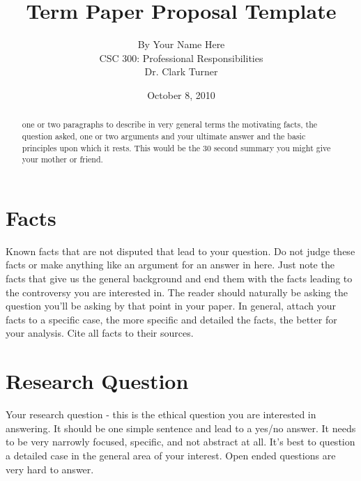 \documentclass[12pt]{article}
\begin{document}
\title{\vfill Term Paper Proposal Template} %
\author{
 By Your Name Here \vspace{10pt} \\ 
CSC 300: Professional Responsibilities  \vspace{10pt} \\ 
Dr. Clark Turner \vspace{10pt} \\ 
}
\date{October 8, 2010} %

\maketitle

\vfill  %
\begin{abstract}
one or two paragraphs to describe in very general terms the motivating facts, the question asked, one or two arguments and your ultimate answer and the basic principles upon which it rests. This would be the 30 second summary you might give your mother or friend. \cite{handout}
\end{abstract}

\thispagestyle{empty} %
\newpage



\section{Facts}
Known facts that are not disputed that lead to your question. Do not judge these facts or make anything like an argument for an answer in here. Just note the facts that give us the general background and end them with the facts leading to the controversy you are interested in. The reader should naturally be asking the question you'll be asking by that point in your paper. In general, attach your facts to a specific case, the more specific and detailed the facts, the better for your analysis. Cite all facts to their sources. \cite{handout}

\section{Research Question}
Your research question - this is the ethical question you are interested in answering. It should be one simple sentence and lead to a yes/no answer. It needs to be very narrowly focused, specific, and not abstract at all. It's best to question a detailed case in the general area of your interest. Open ended questions are very hard to answer. \cite{handout}
\end{document}
